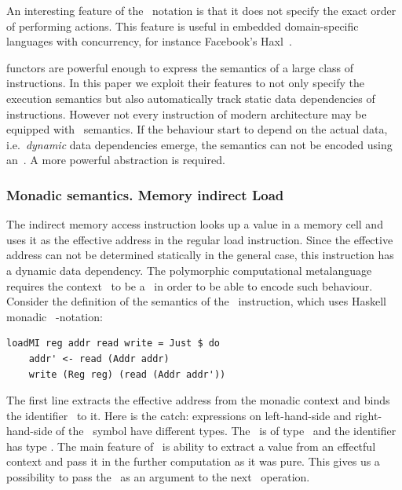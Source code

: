 An interesting feature of the~ notation is that it does not specify the exact order of
performing actions. This feature is useful in embedded domain-specific languages
with concurrency, for instance Facebook's Haxl~\cite{Marlow:2014:NFA:2692915.2628144}.

 functors are powerful enough to express the semantics of a
large class of instructions. In this paper we exploit their features to not only
specify the execution semantics but also automatically track static data dependencies
of instructions. However not every instruction of modern architecture may be
equipped with~ semantics. If the behaviour start to depend on the
actual data, i.e.~\emph{dynamic} data dependencies emerge, the semantics can not
be encoded using an~. A more powerful abstraction is required.

\subsubsection{Monadic semantics. Memory indirect Load}

The indirect memory access instruction looks up a value in a memory cell and uses
it as the effective address in the regular load instruction. Since the effective
address can not be determined statically in the general case, this instruction
has a dynamic data dependency. The polymorphic computational metalanguage requires
the context~ to be a~ in order to be able to encode such behaviour.
Consider the definition of the semantics of the~ instruction, which
uses Haskell monadic ~-notation:

\begin{verbatim}
loadMI reg addr read write = Just $ do
    addr' <- read (Addr addr)
    write (Reg reg) (read (Addr addr'))
\end{verbatim}

The first line extracts the effective address from the monadic context
and binds the identifier~ to it. Here is the catch: expressions
on left-hand-side and right-hand-side of the~\hs{<-} symbol have different types.
The~ is of type~ and the
identifier~ has type . The main feature of~
is ability to extract a value from an effectful context and pass it in the further
computation as it was pure. This gives us a possibility to pass the~
as an argument to the next~ operation.

